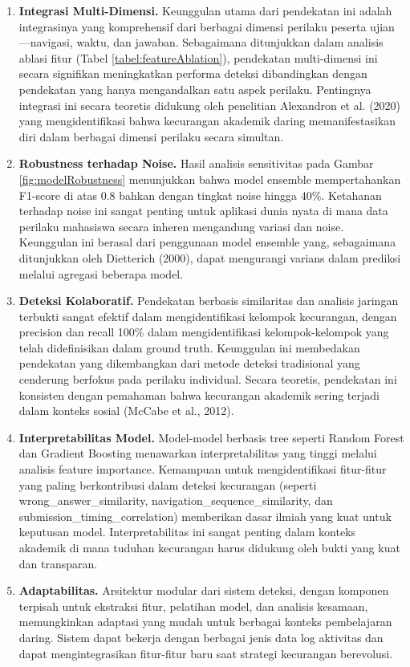 \begin{enumerate}
    \item \textbf{Integrasi Multi-Dimensi.} Keunggulan utama dari pendekatan ini adalah integrasinya yang komprehensif dari berbagai dimensi perilaku peserta ujian—navigasi, waktu, dan jawaban. Sebagaimana ditunjukkan dalam analisis ablasi fitur (Tabel \ref{tabel:featureAblation}), pendekatan multi-dimensi ini secara signifikan meningkatkan performa deteksi dibandingkan dengan pendekatan yang hanya mengandalkan satu aspek perilaku. Pentingnya integrasi ini secara teoretis didukung oleh penelitian Alexandron et al. (2020) yang mengidentifikasi bahwa kecurangan akademik daring memanifestasikan diri dalam berbagai dimensi perilaku secara simultan.
    
    \item \textbf{Robustness terhadap Noise.} Hasil analisis sensitivitas pada Gambar \ref{fig:modelRobustness} menunjukkan bahwa model ensemble mempertahankan F1-score di atas 0.8 bahkan dengan tingkat noise hingga 40\%. Ketahanan terhadap noise ini sangat penting untuk aplikasi dunia nyata di mana data perilaku mahasiswa secara inheren mengandung variasi dan noise. Keunggulan ini berasal dari penggunaan model ensemble yang, sebagaimana ditunjukkan oleh Dietterich (2000), dapat mengurangi varians dalam prediksi melalui agregasi beberapa model.
    
    \item \textbf{Deteksi Kolaboratif.} Pendekatan berbasis similaritas dan analisis jaringan terbukti sangat efektif dalam mengidentifikasi kelompok kecurangan, dengan precision dan recall 100\% dalam mengidentifikasi kelompok-kelompok yang telah didefinisikan dalam ground truth. Keunggulan ini membedakan pendekatan yang dikembangkan dari metode deteksi tradisional yang cenderung berfokus pada perilaku individual. Secara teoretis, pendekatan ini konsisten dengan pemahaman bahwa kecurangan akademik sering terjadi dalam konteks sosial (McCabe et al., 2012).
    
    \item \textbf{Interpretabilitas Model.} Model-model berbasis tree seperti Random Forest dan Gradient Boosting menawarkan interpretabilitas yang tinggi melalui analisis feature importance. Kemampuan untuk mengidentifikasi fitur-fitur yang paling berkontribusi dalam deteksi kecurangan (seperti wrong\_answer\_similarity, navigation\_sequence\_similarity, dan submission\_timing\_correlation) memberikan dasar ilmiah yang kuat untuk keputusan model. Interpretabilitas ini sangat penting dalam konteks akademik di mana tuduhan kecurangan harus didukung oleh bukti yang kuat dan transparan.
    
    \item \textbf{Adaptabilitas.} Arsitektur modular dari sistem deteksi, dengan komponen terpisah untuk ekstraksi fitur, pelatihan model, dan analisis kesamaan, memungkinkan adaptasi yang mudah untuk berbagai konteks pembelajaran daring. Sistem dapat bekerja dengan berbagai jenis data log aktivitas dan dapat mengintegrasikan fitur-fitur baru saat strategi kecurangan berevolusi.
\end{enumerate}

